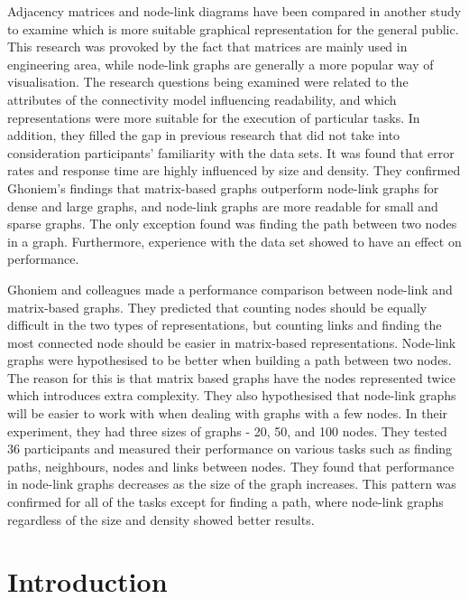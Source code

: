 \documentclass{l4proj}
\begin{document}
Adjacency matrices and node-link diagrams have been compared in another study \cite{keller2006matrices} to examine which is more suitable graphical representation for the general public. This research was provoked by the fact that matrices are mainly used in engineering area, while node-link graphs are generally a more popular way of visualisation. The research questions being examined were related to the attributes of the connectivity model influencing readability, and which representations were more suitable for the execution of particular tasks. In addition, they filled the gap in previous research that did not take into consideration participants' familiarity with the data sets. It was found that error rates and response time are highly influenced by size and density. They confirmed Ghoniem's \cite{ghoniem2004comparison} findings that matrix-based graphs outperform node-link graphs for dense and large graphs, and node-link graphs are more readable for small and sparse graphs. The only exception found was finding the path between two nodes in a graph. Furthermore, experience with the data set showed to have an effect on performance. 

Ghoniem and colleagues \cite{ghoniem2004comparison} made a performance comparison between node-link and matrix-based graphs. They predicted that counting nodes should be equally difficult in the two types of representations, but counting links and finding the most connected node should be easier in matrix-based representations. Node-link graphs were hypothesised to be better when building a path between two nodes. The reason for this is that matrix based graphs have the nodes represented twice which introduces extra complexity. They also hypothesised that node-link graphs will be easier to work with when dealing with graphs with a few nodes. In their experiment, they had three sizes of graphs - 20, 50, and 100 nodes. They tested 36 participants and measured their performance on various tasks such as finding paths, neighbours, nodes and links between nodes. They found that performance in node-link graphs decreases as the size of the graph increases. This pattern was confirmed for all of the tasks except for finding a path, where node-link graphs regardless of the size and density showed better results.

\chapter{Introduction}
\end{document}
